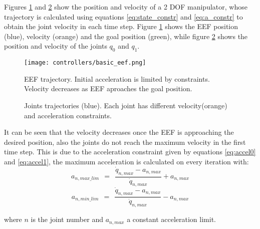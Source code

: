 Figures \ref{fig:basic_eef} and \ref{fig:basic} show the position and velocity of a 2 DOF manipulator, whose trajectory is calculated using equations \ref{eq:state_constr} and \ref{eq:a_constr} to obtain the joint velocity in each time step. Figure \ref{fig:basic_eef}  shows the EEF position (blue), velocity (orange) and the goal position (green), while figure \ref{fig:basic} shows the position and velocity of the joints $q_{0}$ and $q_{1}$.

\begin{figure}[H]
	\centering
	\texttt{[image: controllers/basic\_eef.png]}
	\vspace{-10pt}
	\caption[Basic 2 DOF controller: EEF trajectory.] {EEF trajectory. Initial acceleration is limited by constraints. Velocity decreases as EEF aproaches the goal position.}
	\vspace{-15pt}
	\label{fig:basic_eef}
\end{figure}
\begin{figure}[H]
	\centering
	\begin{subfigure}[][Joint $q_{0}$]
		{\texttt{[image: controllers/basic\_0.png]}}
	\end{subfigure}
	\begin{subfigure}[][Joint $q_{1}$]
		{\texttt{[image: controllers/basic\_1.png]}}
	\end{subfigure}
	\vspace{-12pt}
	\caption[Basic 2 DOF controller: Joints trajectories]{Joints trajectories (blue). Each joint has different velocity(orange) and acceleration constraints.}
	\vspace{-10pt}
	\label{fig:basic}
\end{figure}
It can be seen that the velocity decreases once the EEF is approaching the desired position, also the joints do not reach the maximum velocity in the first time step. This is due to the acceleration constraint given by equations \ref{eq:accel0} and \ref{eq:accel1}, the maximum acceleration is calculated on every iteration with:
\begin{equation}
a_{n,max\_lim}\ \ =\ \ \frac{\dot{q}_{n,max} - a_{n,max}}{\dot{q}_{n,max}} + a_{n,max}
\end{equation} 
\begin{equation}
a_{n,min\_lim}\ \ =\ \ \frac{\dot{q}_{n,max} - a_{n,max}}{\dot{q}_{n,max}} - a_{n,max}
\end{equation}

where $n$ is the joint number and $a_{n,max}$ a constant acceleration limit.

